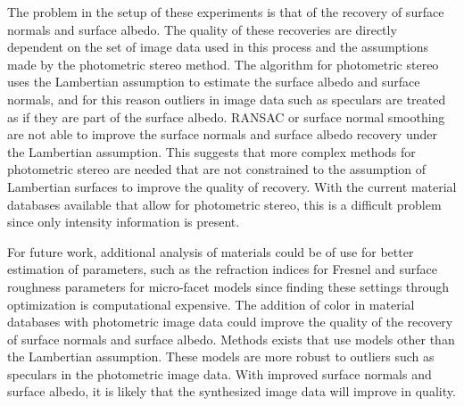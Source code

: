 The problem in the setup of these experiments is that of the recovery of surface normals and surface albedo. The quality of these recoveries are directly dependent on the set of image data used in this process and the assumptions made by the photometric stereo method. The algorithm for photometric stereo uses the Lambertian assumption to estimate the surface albedo and surface normals, and for this reason outliers in image data such as speculars are treated as if they are part of the surface albedo. RANSAC or surface normal smoothing are not able to improve the surface normals and surface albedo recovery under the Lambertian assumption. This suggests that more complex methods for photometric stereo are needed that are not constrained to the assumption of Lambertian surfaces to improve the quality of recovery. With the current material databases available that allow for photometric stereo, this is a difficult problem since only intensity information is present. 

For future work, additional analysis of materials could be of use for better estimation of parameters, such as the refraction indices for Fresnel and surface roughness parameters for micro-facet models since finding these settings through optimization is computational expensive. The addition of color in material databases with photometric image data could improve the quality of the recovery of surface normals and surface albedo. Methods exists that use models other than the Lambertian assumption. These models are more robust to outliers such as speculars in the photometric image data. With improved surface normals and surface albedo, it is likely that the synthesized image data will improve in quality.
